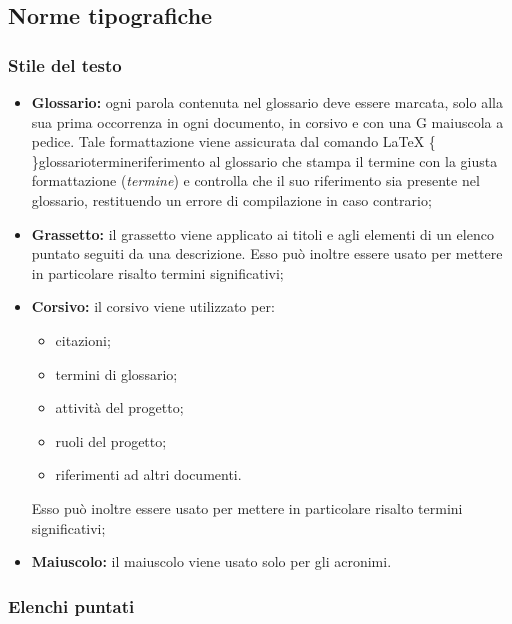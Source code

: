 \documentclass[../NormediProgetto.tex]{subfiles}
\begin{document}

\subsection{Norme tipografiche}

\subsubsection{Stile del testo}

\begin{itemize}
    
    \item \textbf{Glossario:} ogni parola contenuta nel glossario deve essere marcata, solo alla sua prima occorrenza in ogni documento, in corsivo e con una G maiuscola a pedice. Tale formattazione viene assicurata dal comando \LaTeX{} \{ \}glossario{termine}{riferimento al glossario} che stampa il termine con la giusta formattazione (\textit{termine}) e controlla che il suo riferimento sia presente nel glossario, restituendo un errore di compilazione in caso contrario;  
    
    \item \textbf{Grassetto:} il grassetto viene applicato ai titoli e agli elementi di un elenco puntato seguiti da una descrizione. Esso può inoltre essere usato per mettere in particolare risalto termini significativi; 
    
    \item \textbf{Corsivo:} il corsivo viene utilizzato per:
    \begin{itemize}
        \item citazioni;
        \item termini di glossario;
        \item attività del progetto;
        \item ruoli del progetto;
        \item riferimenti ad altri documenti.
    \end{itemize}
    
     Esso può inoltre essere usato per mettere in particolare risalto termini significativi;
    
    \item{\textbf{Maiuscolo:}} il maiuscolo viene usato solo per gli acronimi.

\end{itemize}

\subsubsection{Elenchi puntati}
\end{document}
